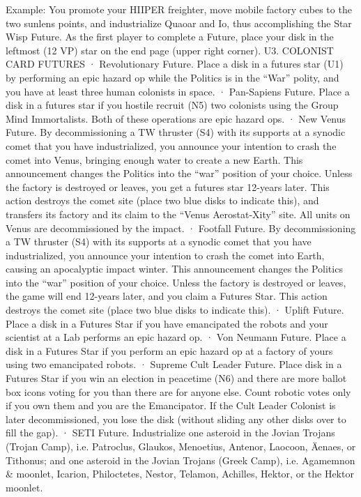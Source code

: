 \documentclass[a4paper]{book}
\begin{document}
Example: You promote your HIIPER freighter, move mobile factory cubes to the two sunlens points, and industrialize Quaoar and Io, thus accomplishing the Star Wisp Future. As the first player to complete a Future, place your disk in the leftmost (12 VP) star on the end page (upper right corner).
U3. COLONIST CARD FUTURES
·       Revolutionary Future. Place a disk in a futures star (U1) by performing an epic hazard op while the Politics is in the “War” polity, and you have at least three human colonists in space.
·       Pan-Sapiens Future. Place a disk in a futures star if you hostile recruit (N5) two colonists using the Group Mind Immortalists. Both of these operations are epic hazard ops.
·   	New Venus Future. By decommissioning a TW thruster (S4) with its supports at a synodic comet that you have industrialized, you announce your intention to crash the comet into Venus, bringing enough water to create a new Earth. This announcement changes the Politics into the “war” position of your choice. Unless the factory is destroyed or leaves, you get a futures star 12-years later. This action destroys the comet site (place two blue disks to indicate this), and transfers its factory and its claim to the “Venus Aerostat-Xity” site. All units on Venus are decommissioned by the impact.
·   	Footfall Future. By decommissioning a TW thruster (S4) with its supports at a synodic comet that you have industrialized, you announce your intention to crash the comet into Earth, causing an apocalyptic impact winter. This announcement changes the Politics into the “war” position of your choice. Unless the factory is destroyed or leaves, the game will end 12-years later, and you claim a Futures Star. This action destroys the comet site (place two blue disks to indicate this).
·       Uplift Future. Place a disk in a Futures Star if you have emancipated the robots and your scientist at a Lab performs an epic hazard op.
·       Von Neumann Future. Place a disk in a Futures Star if you perform an epic hazard op at a factory of yours using two emancipated robots.
·       Supreme Cult Leader Future. Place disk in a Futures Star if you win an election in peacetime (N6) and there are more ballot box icons voting for you than there are for anyone else. Count robotic votes only if you own them and you are the Emancipator. If the Cult Leader Colonist is later decommissioned, you lose the disk (without sliding any other disks over to fill the gap). 
·   	SETI Future. Industrialize one asteroid in the Jovian Trojans (Trojan Camp), i.e. Patroclus, Glaukos, Menoetius, Antenor, Laocoon, Äenaes, or Tithonus; and one asteroid in the Jovian Trojans (Greek Camp), i.e. Agamemnon \& moonlet, Icarion, Philoctetes, Nestor, Telamon, Achilles, Hektor, or the Hektor moonlet.
\end{document}

